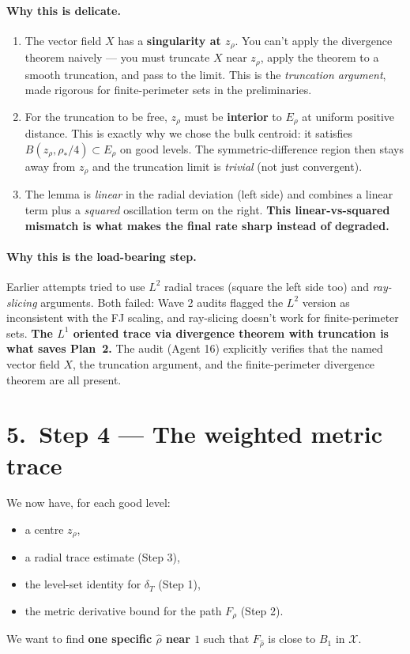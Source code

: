 \documentclass[11pt,a4paper]{article}
\newcommand{\X}{\mathcal{X}}
\newcommand{\Erho}{E_\rho}
\newcommand{\Frho}{F_\rho}
\newcommand{\rhad}{\widehat{\rho}}
\newcommand{\deltaT}{\delta_T}
\begin{document}
\paragraph{Why this is delicate.}
\begin{enumerate}[leftmargin=*,itemsep=2pt]
\item The vector field $X$ has a \textbf{singularity at $z_\rho$}. You can't apply the divergence theorem naively --- you must truncate $X$ near $z_\rho$, apply the theorem to a smooth truncation, and pass to the limit. This is the \emph{truncation argument}, made rigorous for finite-perimeter sets in the preliminaries.
\item For the truncation to be free, $z_\rho$ must be \textbf{interior} to $\Erho$ at uniform positive distance. This is exactly why we chose the bulk centroid: it satisfies $B(z_\rho, \rho_*/4) \subset \Erho$ on good levels. The symmetric-difference region then stays away from $z_\rho$ and the truncation limit is \emph{trivial} (not just convergent).
\item The lemma is \emph{linear} in the radial deviation (left side) and combines a linear term plus a \emph{squared} oscillation term on the right. \textbf{This linear-vs-squared mismatch is what makes the final rate sharp instead of degraded.}
\end{enumerate}

\paragraph{Why this is the load-bearing step.}
Earlier attempts tried to use $L^2$ radial traces (square the left side too) and \emph{ray-slicing} arguments. Both failed: Wave 2 audits flagged the $L^2$ version as inconsistent with the FJ scaling, and ray-slicing doesn't work for finite-perimeter sets. \textbf{The $L^1$ oriented trace via divergence theorem with truncation is what saves Plan~2.} The audit (Agent 16) explicitly verifies that the named vector field $X$, the truncation argument, and the finite-perimeter divergence theorem are all present.

\section*{5.\ Step 4 --- The weighted metric trace}

We now have, for each good level:
\begin{itemize}[itemsep=1pt,leftmargin=*]
\item a centre $z_\rho$,
\item a radial trace estimate (Step 3),
\item the level-set identity for $\deltaT$ (Step 1),
\item the metric derivative bound for the path $\Frho$ (Step 2).
\end{itemize}
We want to find \textbf{one specific $\rhad$ near $1$} such that $F_{\rhad}$ is close to $B_1$ in $\X$.
\end{document}
